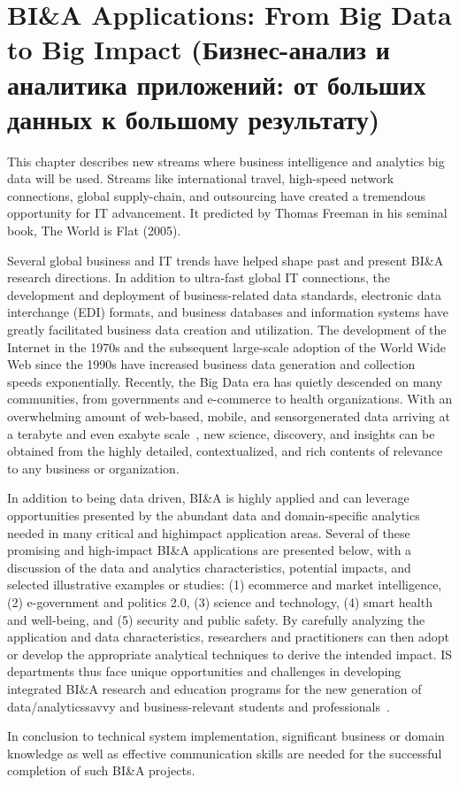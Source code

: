 \section{BI\&A Applications: From Big Data to Big Impact (Бизнес-анализ и аналитика приложений: от больших данных к большому результату)}

This chapter describes new streams where business intelligence and analytics big data will be used. Streams like international travel, high-speed network connections, global supply-chain, and
outsourcing have created a tremendous opportunity for IT
advancement. It predicted by Thomas Freeman in his seminal
book, The World is Flat (2005).

Several global business and IT trends have helped shape past
and present BI\&A research directions. In addition to ultra-fast
global IT connections, the development and deployment of
business-related data standards, electronic data interchange
(EDI) formats, and business databases and information
systems have greatly facilitated business data creation and
utilization. The development of the Internet in the 1970s and
the subsequent large-scale adoption of the World Wide Web
since the 1990s have increased business data generation and
collection speeds exponentially. Recently, the Big Data era
has quietly descended on many communities, from governments
and e-commerce to health organizations. With an
overwhelming amount of web-based, mobile, and sensorgenerated
data arriving at a terabyte and even exabyte scale~\cite{Gelfand:2012}, new science, discovery, and
insights can be obtained from the highly detailed, contextualized,
and rich contents of relevance to any business or
organization.

In addition to being data driven, BI\&A is highly applied and
can leverage opportunities presented by the abundant data and
domain-specific analytics needed in many critical and highimpact
application areas. Several of these promising and
high-impact BI\&A applications are presented below, with a
discussion of the data and analytics characteristics, potential
impacts, and selected illustrative examples or studies: (1) ecommerce
and market intelligence, (2) e-government and
politics 2.0, (3) science and technology, (4) smart health and
well-being, and (5) security and public safety. By carefully
analyzing the application and data characteristics, researchers
and practitioners can then adopt or develop the appropriate
analytical techniques to derive the intended impact. IS departments thus face unique opportunities and
challenges in developing integrated BI\&A research and
education programs for the new generation of data/analyticssavvy
and business-relevant students and professionals~\cite{Chen:2011b}.

In conclusion to technical system implementation, significant business
or domain knowledge as well as effective communication
skills are needed for the successful completion of such BI\&A
projects.